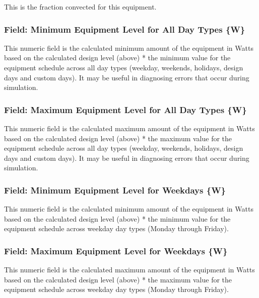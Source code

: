 This is the fraction convected for this equipment.




\subsubsection{Field: Minimum Equipment Level for All Day Types \{W\}}\label{field-minimum-equipment-level-for-all-day-types-w-1}

This numeric field is the calculated minimum amount of the equipment in Watts based on the calculated design level (above) * the minimum value for the equipment schedule across all day types (weekday, weekends, holidays, design days and custom days). It may be useful in diagnosing errors that occur during simulation.

\subsubsection{Field: Maximum Equipment Level for All Day Types \{W\}}\label{field-maximum-equipment-level-for-all-day-types-w-1}

This numeric field is the calculated maximum amount of the equipment in Watts based on the calculated design level (above) * the maximum value for the equipment schedule across all day types (weekday, weekends, holidays, design days and custom days). It may be useful in diagnosing errors that occur during simulation.

\subsubsection{Field: Minimum Equipment Level for Weekdays \{W\}}\label{field-minimum-equipment-level-for-weekdays-w-1}

This numeric field is the calculated minimum amount of the equipment in Watts based on the calculated design level (above) * the minimum value for the equipment schedule across weekday day types (Monday through Friday).

\subsubsection{Field: Maximum Equipment Level for Weekdays \{W\}}\label{field-maximum-equipment-level-for-weekdays-w-1}

This numeric field is the calculated maximum amount of the equipment in Watts based on the calculated design level (above) * the maximum value for the equipment schedule across weekday day types (Monday through Friday).


